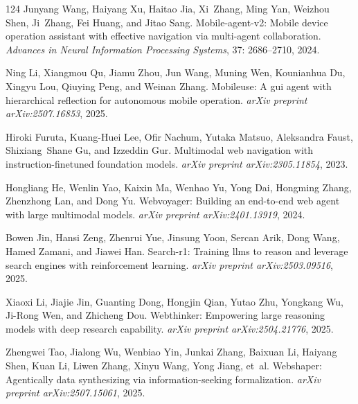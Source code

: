 \documentclass[]{youtu} %
\begin{document}
\begin{thebibliography}{124}
Junyang Wang, Haiyang Xu, Haitao Jia, Xi~Zhang, Ming Yan, Weizhou Shen, Ji~Zhang, Fei Huang, and Jitao Sang.
\newblock Mobile-agent-v2: Mobile device operation assistant with effective navigation via multi-agent collaboration.
\newblock \emph{Advances in Neural Information Processing Systems}, 37: 2686--2710, 2024.

Ning Li, Xiangmou Qu, Jiamu Zhou, Jun Wang, Muning Wen, Kounianhua Du, Xingyu Lou, Qiuying Peng, and Weinan Zhang.
\newblock Mobileuse: A gui agent with hierarchical reflection for autonomous mobile operation.
\newblock \emph{arXiv preprint arXiv:2507.16853}, 2025{}.

Hiroki Furuta, Kuang-Huei Lee, Ofir Nachum, Yutaka Matsuo, Aleksandra Faust, Shixiang~Shane Gu, and Izzeddin Gur.
\newblock Multimodal web navigation with instruction-finetuned foundation models.
\newblock \emph{arXiv preprint arXiv:2305.11854}, 2023.

Hongliang He, Wenlin Yao, Kaixin Ma, Wenhao Yu, Yong Dai, Hongming Zhang, Zhenzhong Lan, and Dong Yu.
\newblock Webvoyager: Building an end-to-end web agent with large multimodal models.
\newblock \emph{arXiv preprint arXiv:2401.13919}, 2024.

Bowen Jin, Hansi Zeng, Zhenrui Yue, Jinsung Yoon, Sercan Arik, Dong Wang, Hamed Zamani, and Jiawei Han.
\newblock Search-r1: Training llms to reason and leverage search engines with reinforcement learning.
\newblock \emph{arXiv preprint arXiv:2503.09516}, 2025{}.

Xiaoxi Li, Jiajie Jin, Guanting Dong, Hongjin Qian, Yutao Zhu, Yongkang Wu, Ji-Rong Wen, and Zhicheng Dou.
\newblock Webthinker: Empowering large reasoning models with deep research capability.
\newblock \emph{arXiv preprint arXiv:2504.21776}, 2025{}.

Zhengwei Tao, Jialong Wu, Wenbiao Yin, Junkai Zhang, Baixuan Li, Haiyang Shen, Kuan Li, Liwen Zhang, Xinyu Wang, Yong Jiang, et~al.
\newblock Webshaper: Agentically data synthesizing via information-seeking formalization.
\newblock \emph{arXiv preprint arXiv:2507.15061}, 2025.


\end{thebibliography}
\end{document}
